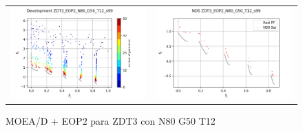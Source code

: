 \begin{figure}[H]
\begin{tabular}{c c}
    \includegraphics[scale=0.5]{figures/ZDT3_EOP2_N80_G50_T12/s99_dev.png} &
    \includegraphics[scale=0.5]{figures/ZDT3_EOP2_N80_G50_T12/s99_nds.png}\\
    \end{tabular}
    \caption{MOEA/D + EOP2 para ZDT3 con N80 G50 T12 }
    \label{fig:8}
\end{figure}

